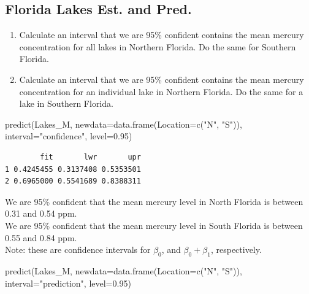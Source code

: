 \documentclass[
  letterpaper,
  DIV=11,
  numbers=noendperiod]{scrreprt}
\newenvironment{Shaded}{\begin{snugshade}}{\end{snugshade}}
\newcommand{\AttributeTok}[1]{\textcolor[rgb]{0.40,0.45,0.13}{#1}}
\newcommand{\FloatTok}[1]{\textcolor[rgb]{0.68,0.00,0.00}{#1}}
\newcommand{\FunctionTok}[1]{\textcolor[rgb]{0.28,0.35,0.67}{#1}}
\newcommand{\NormalTok}[1]{\textcolor[rgb]{0.00,0.23,0.31}{#1}}
\newcommand{\StringTok}[1]{\textcolor[rgb]{0.13,0.47,0.30}{#1}}
\begin{document}
\subsection{Florida Lakes Est. and
Pred.}\label{florida-lakes-est.-and-pred.}

\begin{enumerate}
\def\labelenumi{\arabic{enumi}.}
\item
  Calculate an interval that we are 95\% confident contains the mean
  mercury concentration for all lakes in Northern Florida. Do the same
  for Southern Florida.
\item
  Calculate an interval that we are 95\% confident contains the mean
  mercury concentration for an individual lake in Northern Florida. Do
  the same for a lake in Southern Florida.
\end{enumerate}

\begin{Shaded}
\begin{Highlighting}[]
\FunctionTok{predict}\NormalTok{(Lakes\_M, }\AttributeTok{newdata=}\FunctionTok{data.frame}\NormalTok{(}\AttributeTok{Location=}\FunctionTok{c}\NormalTok{(}\StringTok{"N"}\NormalTok{, }\StringTok{"S"}\NormalTok{)), }\AttributeTok{interval=}\StringTok{"confidence"}\NormalTok{, }\AttributeTok{level=}\FloatTok{0.95}\NormalTok{)}
\end{Highlighting}
\end{Shaded}

\begin{verbatim}
        fit       lwr       upr
1 0.4245455 0.3137408 0.5353501
2 0.6965000 0.5541689 0.8388311
\end{verbatim}

We are 95\% confident that the mean mercury level in North Florida is
between 0.31 and 0.54 ppm.\\
We are 95\% confident that the mean mercury level in South Florida is
between 0.55 and 0.84 ppm.\\
Note: these are confidence intervals for \(\beta_0\), and
\(\beta_0 + \beta_1\), respectively.

\begin{Shaded}
\begin{Highlighting}[]
\FunctionTok{predict}\NormalTok{(Lakes\_M, }\AttributeTok{newdata=}\FunctionTok{data.frame}\NormalTok{(}\AttributeTok{Location=}\FunctionTok{c}\NormalTok{(}\StringTok{"N"}\NormalTok{, }\StringTok{"S"}\NormalTok{)), }\AttributeTok{interval=}\StringTok{"prediction"}\NormalTok{, }\AttributeTok{level=}\FloatTok{0.95}\NormalTok{)}
\end{Highlighting}
\end{Shaded}
\end{document}
